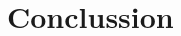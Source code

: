 \doublespacing %

\chapter{Conclussion}
\label{ch5}

\begin{spacing}{1} %
\minitoc %
\end{spacing} %
\thesisspacing %


